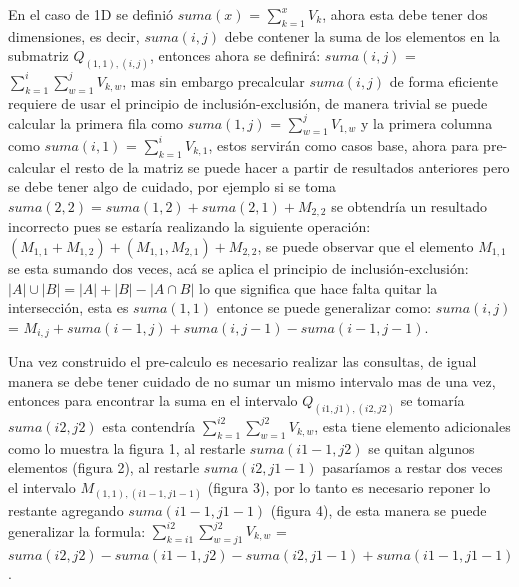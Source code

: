 \documentclass[12pt, a4paper]{article}
\begin{document}
	En el caso de 1D se definió $suma(x)$ = $\sum_{k=1}^{x} V_{k}$, ahora esta debe tener dos dimensiones, es decir, 
	$suma(i,j)$ debe contener la suma de los elementos en la submatriz $Q_{(1,1),(i,j)}$, entonces ahora se definirá:
	$suma(i,j)$ = $\sum_{k=1}^{i} \sum_{w=1}^{j} V_{k,w}$, mas sin embargo precalcular $suma(i,j)$ de forma eficiente
	requiere de usar el principio de inclusión-exclusión, de manera trivial se puede calcular la primera fila como
	$suma(1,j)$ = $\sum_{w=1}^{j} V_{1,w}$ y la primera columna como $suma(i,1)$ = $\sum_{k=1}^{i} V_{k,1}$, estos
	servirán como casos base, ahora para pre-calcular el resto de la matriz se puede hacer a partir de resultados
	anteriores pero se debe tener algo de cuidado, por ejemplo si se toma $suma(2,2) = suma(1,2) + suma(2,1) + M_{2,2}$
	se obtendría un resultado incorrecto pues se estaría realizando la siguiente operación: 
	$(M_{1,1}+M_{1,2}) + (M_{1,1},M_{2,1}) + M_{2,2}$, se puede observar que el elemento $M_{1,1}$ se esta sumando dos
	veces, acá se aplica el principio de inclusión-exclusión: $|A| \cup |B| = |A| + |B| - |A \cap B|$ lo que significa
	que hace falta quitar la intersección, esta es $suma(1,1)$ entonce se puede generalizar como: 
	$suma(i,j)$ = $M_{i,j} + suma(i-1,j) + suma(i,j-1) - suma(i-1,j-1)$.
	
	Una vez construido el pre-calculo es necesario realizar las consultas, de igual manera se debe tener cuidado de
	no sumar un mismo intervalo mas de una vez, entonces para encontrar la suma en el intervalo $Q_{(i1,j1),(i2,j2)}$
	se tomaría $suma(i2,j2)$ esta contendría $\sum_{k=1}^{i2} \sum_{w=1}^{j2} V_{k,w}$, esta tiene elemento adicionales
	como lo muestra la figura 1, al restarle $suma(i1-1,j2)$ se quitan algunos elementos (figura 2), al restarle
	$suma(i2,j1-1)$ pasaríamos a restar dos veces el intervalo $M_{(1,1),(i1-1,j1-1)}$ (figura 3), por lo tanto es
	necesario reponer lo restante agregando $suma(i1-1,j1-1)$ (figura 4), de esta manera se puede generalizar la 
	formula: $\sum_{k=i1}^{i2} \sum_{w=j1}^{j2} V_{k,w}$ = $suma(i2,j2)-suma(i1-1,j2)-suma(i2,j1-1)+suma(i1-1,j1-1)$.
	
\end{document}
